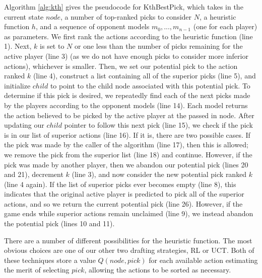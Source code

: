 \documentclass[letterpaper]{article}
\numberwithin{equation}{section}
\numberwithin{theorem}{section}
\numberwithin{lemma}{section}
\numberwithin{df}{section}
\begin{document}
Algorithm \ref{alg:kth} gives the pseudocode for KthBestPick, which takes in the current state $node$, a number of top-ranked picks to consider $N$, a heuristic function $h$, and a sequence of opponent models $m_0, ..., m_{n-1}$ (one for each player) as parameters.  We first rank the actions according to the heuristic function (line 1).  Next, $k$ is set to $N$ or one less than the number of picks remaining for the active player (line 3) (as we do not have enough picks to consider more inferior actions), whichever is smaller.  Then, we set our potential pick to the action ranked $k$ (line 4), construct a list containing all of the superior picks (line 5), and initialize $child$ to point to the child node associated with this potential pick.  To determine if this pick is desired, we repeatedly find each of the next picks made by the players according to the opponent models (line 14).  Each model returns the action believed to be picked by the active player at the passed in node.  After updating our $child$ pointer to follow this next pick (line 15), we check if the pick is in our list of superior actions (line 16).  If it is, there are two possible cases.  If the pick was made by the caller of the algorithm (line 17), then this is allowed; we remove the pick from the superior list (line 18) and continue.  However, if the pick was made by another player, then we abandon our potential pick (lines 20 and 21), decrement $k$ (line 3), and now consider the new potential pick ranked $k$ (line 4 again).  If the list of superior picks ever becomes empty (line 8), this indicates that the original active player is predicted to pick all of the superior actions, and so we return the current potential pick (line 26).  However, if the game ends while superior actions remain unclaimed (line 9), we instead abandon the potential pick (lines 10 and 11). 

There are a number of different possibilities for the heuristic function.  The most obvious choices are one of our other two drafting strategies, RL or UCT.  Both of these techniques store a value $Q(node,pick)$ for each available action estimating the merit of selecting $pick$, allowing the actions to be sorted as necessary.
\end{document}
